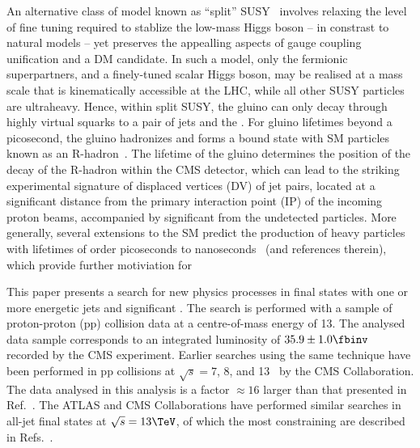 An alternative class of model known as ``split''
SUSY~\cite{ArkaniHamed:2004fb, Giudice:2004tc} involves relaxing the
level of fine tuning required to stablize the low-mass Higgs boson --
in constrast to natural models -- yet preserves the appealling aspects
of gauge coupling unification and a DM candidate. In such a model,
only the fermionic superpartners, and a finely-tuned scalar Higgs
boson, may be realised at a mass scale that is kinematically
accessible at the LHC, while all other SUSY particles are
ultraheavy. Hence, within split SUSY, the gluino can only decay
through highly virtual squarks to a pair of jets and the \chiz. For
gluino lifetimes beyond a picosecond, the gluino hadronizes and forms
a bound state with SM particles known as an R-hadron~\cite{}. The
lifetime of the gluino determines the position of the decay of the
R-hadron within the CMS detector, which can lead to the striking
experimental signature of displaced vertices (DV) of jet pairs,
located at a significant distance from the primary interaction point
(IP) of the incoming proton beams, accompanied by significant
\ptvecmiss from the undetected \chiz particles. More generally,
several extensions to the SM predict the production of heavy particles
with lifetimes of order picoseconds to nanoseconds~\cite{} (and
references therein), which provide further motiviation for


This paper presents a search for new physics processes in final states
with one or more energetic jets and significant \ptvecmiss. The search
is performed with a sample of proton-proton (pp) collision data at a
centre-of-mass energy of 13\TeV. The analysed data sample corresponds
to an integrated luminosity of $35.9 \pm 1.0 \fbinv$ recorded by the
CMS experiment. Earlier searches using the same technique have been
performed in pp collisions at $\sqrt{s} = 7$, 8, and
13\TeV~\cite{RA1Paper, RA1Paper2011, RA1Paper2011FULL, RA1Paper2012,
  RA1Parked, Khachatryan:2016dvc} by the CMS Collaboration. The data
analysed in this analysis is a factor ${\approx}16$ larger than that
presented in Ref.~\cite{Khachatryan:2016dvc}. The ATLAS and CMS
Collaborations have performed similar searches in all-jet final states
at $\sqrt{s} = 13\TeV$, of which the most constraining are described
in Refs.~\cite{}.

